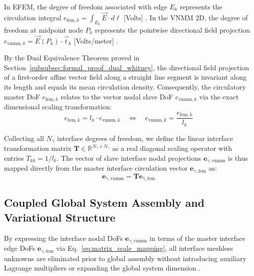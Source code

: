 \documentclass[preprint,12pt]{elsarticle}
\begin{document}
In EFEM, the degree of freedom associated with edge $E_k$ represents the circulation integral $e_{\mathrm{fem}, k} = \int_{E_k} \vec{E} \cdot d\boldsymbol{\ell}$ [Volts] \cite{nedelec1980mixed, monk2003finite}. In the VNMM 2D, the degree of freedom at midpoint node $P_k$ represents the pointwise directional field projection $e_{\mathrm{vnmm}, k} = \vec{E}(P_k) \cdot \vec{t}_k$ [Volts/meter] \cite{ortiz2021nodal, ortiz2023tese}.

By the Dual Equivalence Theorem proved in Section~\ref{subsubsec:formal_proof_dual_whitney}, the directional field projection of a first-order affine vector field along a straight line segment is invariant along its length and equals its mean circulation density. Consequently, the circulatory master DoF $e_{\mathrm{fem}, k}$ relates to the vector nodal slave DoF $e_{\mathrm{vnmm}, k}$ via the exact dimensional scaling transformation:
\begin{equation}
e_{\mathrm{fem}, k} = l_k \cdot e_{\mathrm{vnmm}, k} \quad \Longleftrightarrow \quad e_{\mathrm{vnmm}, k} = \frac{e_{\mathrm{fem}, k}}{l_k}
\label{eq:scale_transformation_entry}
\end{equation}

Collecting all $N_\gamma$ interface degrees of freedom, we define the linear interface transformation matrix $\mathbf{T} \in \mathbb{R}^{N_\gamma \times N_\gamma}$ as a real diagonal scaling operator with entries $T_{kk} = 1/l_k$. The vector of slave interface nodal projections $\mathbf{e}_{\gamma, \mathrm{vnmm}}$ is thus mapped directly from the master interface circulation vector $\mathbf{e}_{\gamma, \mathrm{fem}}$ as:
\begin{equation}
\mathbf{e}_{\gamma, \mathrm{vnmm}} = \mathbf{T} \mathbf{e}_{\gamma, \mathrm{fem}}
\label{eq:matrix_scale_mapping}
\end{equation}


\subsection{Coupled Global System Assembly and Variational Structure}
\label{subsec:spd_global_system}

By expressing the interface nodal DoFs $\mathbf{e}_{\gamma, \mathrm{vnmm}}$ in terms of the master interface edge DoFs $\mathbf{e}_{\gamma, \mathrm{fem}}$ via Eq.~\eqref{eq:matrix_scale_mapping}, all interface meshless unknowns are eliminated prior to global assembly without introducing auxiliary Lagrange multipliers or expanding the global system dimension \cite{elkadmiri2022hybrid}.
\end{document}
